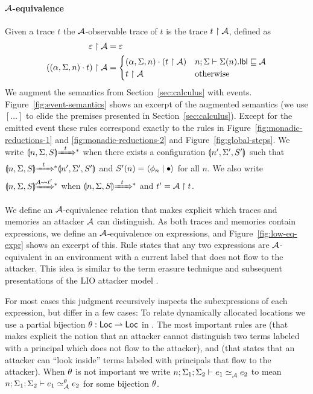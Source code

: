 \paragraph{$\mathcal{A}$-equivalence}
Given a trace $t$ the $\mathcal{A}$-observable trace of $t$ is the trace $t \upharpoonright \mathcal{A}$, defined as
\begin{align*}
\varepsilon \upharpoonright \mathcal{A} &= \varepsilon\\
((\alpha, \Sigma, n) \cdot t) \upharpoonright \mathcal{A} &=
\begin{cases}
(\alpha, \Sigma, n) \cdot (t \upharpoonright \mathcal{A}) & n; \Sigma \vdash \Sigma(n).\mathsf{lbl} \sqsubseteq \mathcal{A} \\
t \upharpoonright \mathcal{A} & \text{otherwise}
\end{cases}
\end{align*}
We augment the semantics from Section~\ref{sec:calculus} with events. Figure~\ref{fig:event-semantics} shows an excerpt of the augmented semantics (we use $[\ldots]$ to elide the premises presented in Section~\ref{sec:calculus}). Except for the emitted event these rules correspond exactly to the rules in Figure~\ref{fig:monadic-reductions-1} and \ref{fig:monadic-reductions-2} and Figure~\ref{fig:global-steps}. We write $\gconfig{n}{\env}{S} \gstepstos[][t]$ when there exists a configuration $\llparenthesis n', \Sigma', S' \rrparenthesis$ such that $\gconfig{n}{\env}{S} \gstepstos[][t] \gconfig{n'}{\env'}{S'}$ and $S'(n) = \langle \phi_n \mid \bullet \rangle$ for all $n$. We also write $\gconfig{n}{\env}{S} \gstepstos[][\Attacker \filtertrace t']$ when $\gconfig{n}{\env}{S} \gstepstos[][t]$ and $t' = \mathcal{A} \upharpoonright t$.

We define an $\mathcal{A}$-equivalence relation that makes explicit which traces and memories an attacker $\mathcal{A}$ can distinguish. As both traces and memories contain expressions, we define an $\mathcal{A}$-equivalence on expressions, and Figure~\ref{fig:low-eq-expr} shows an excerpt of this. Rule  states that any two expressions are $\mathcal{A}$-equivalent in an environment with a current label that does not flow to the attacker. This idea is similar to the term erasure technique \cite{SRMMlio} and subsequent presentations of the LIO attacker model \cite{Stefan:2012:ACT:2364527.2364557, 10.1007/978-3-642-40203-6_40, 10.1007/978-3-319-24858-5_13}.

For most cases this judgment recursively inspects the subexpressions of each expression, but differ in a few cases: To relate dynamically allocated locations we use a partial bijection \cite{Banerjee:2002:SIF:794201.795164, Rajani2018} $\theta: \mathsf{Loc} \rightharpoonup \mathsf{Loc}$ in . The most important rules are  (that makes explicit the notion that an attacker cannot distinguish two terms labeled with a principal which does not flow to the attacker), and  (that states that an attacker can ``look inside'' terms labeled with principals that flow to the attacker). When $\theta$ is not important we write $\loweq{n; \env_1; \env_2}{\Attacker}{\expr_1}{\expr_2}$ to mean $\loweq{n; \env_1; \env_2}{\Attacker}[\bijection]{\expr_1}{\expr_2}$ for some bijection $\theta$.

